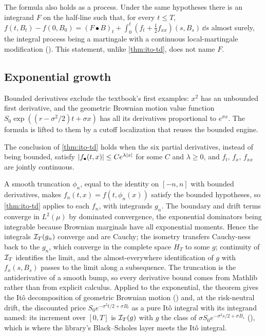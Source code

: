 \documentclass[11pt]{article}
\newcommand{\HT}{H_T}
\newcommand{\bulletB}{\mathbin{\bullet}}
\begin{document}
The formula also holds as a process. Under the same hypotheses there is an integrand $F$ on the
half-line such that, for every $t\le T$, $f(t,B_t)-f(0,B_0)=(F\bulletB B)_t+\int_0^t(f_t+\frac12f_{xx})(s,B_s)\,\dd s$
almost surely, the integral process being a martingale with a continuous local-martingale modification
(). This statement, unlike \cref{thm:ito-td}, does not name $F$.

\subsection{Exponential growth}\label{sec:growth}
Bounded derivatives exclude the textbook's first examples: $x^2$ has an unbounded first derivative, and the
geometric Brownian motion value function $S_0\exp((r-\sigma^2/2)t+\sigma x)$ has all its derivatives
proportional to $e^{\sigma x}$. The formula is lifted to them by a cutoff localization that reuses the
bounded engine.

\begin{theorem}\label{thm:ito-growth}
The conclusion of \cref{thm:ito-td} holds when the six partial derivatives, instead of being bounded,
satisfy $\lvert f_\bullet(t,x)\rvert\le Ce^{\lambda\lvert x\rvert}$ for some $C$ and $\lambda\ge0$, and $f_t$, $f_x$, $f_{xx}$
are jointly continuous.
\end{theorem}

A smooth truncation $\phi_n$, equal to the identity on $[-n,n]$ with bounded derivatives, makes
$f_n(t,x)=f(t,\phi_n(x))$ satisfy the bounded hypotheses, so \cref{thm:ito-td} applies to each $f_n$, with
integrands $g_n$. The boundary and drift terms converge in $L^2(\mu)$ by dominated convergence, the
exponential dominators being integrable because Brownian marginals have all exponential moments. Hence the
integrals $\mathcal{I}_T(g_n)$ converge and are Cauchy; the isometry transfers Cauchy-ness back to the $g_n$, which
converge in the complete space $\HT$ to some $g$; continuity of $\mathcal{I}_T$ identifies the limit, and the
almost-everywhere identification of $g$ with $f_x(s,B_s)$ passes to the limit along a subsequence. The
truncation is the antiderivative of a smooth bump, so every derivative bound comes from Mathlib rather than
from explicit calculus. Applied to the exponential, the theorem gives the It\^o decomposition of geometric
Brownian motion () and, at the risk-neutral drift, the discounted price
$S_0e^{-\sigma^2t/2+\sigma B_t}$ as a pure It\^o integral with its integrand named: its increment over $[0,T]$ is
$\mathcal{I}_T(g)$ with $g$ the class of $\sigma S_0e^{-\sigma^2s/2+\sigma B_s}$ (),
which is where the library's Black--Scholes layer meets the It\^o integral.
\end{document}
